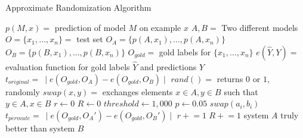 \begin{algorithm}
\caption{Approximate Randomization Algorithm}
\label{alg:approximate-randomization}
	\begin{algorithmic}[1]
    \STATE $p(M,x) =$ prediction of model $M$ on example $x$
    \STATE $A, B =$ Two different models
    \STATE $O = \{x_1, \dotsc, x_n\} =$ test set
    \STATE $O_A = \{p(A,x_1), \dotsc, p(A,x_n)\}$
    \STATE $O_B = \{p(B,x_1), \dotsc, p(B,x_n)\}$
    \STATE $O_{gold} =$ gold labels for $\{x_1, \dotsc, x_n\}$
    \STATE $e(\hat{Y},Y) =$ evaluation function for gold labels $\hat{Y}$ and predictions $Y$
    \STATE $t_{original} =\ \mid e(O_{gold},O_A) - e(O_{gold},O_B) \mid$
    \STATE $rand() =$ returns $0$ or $1$, randomly
    \STATE $swap(x,y) =$ exchanges elements $x \in A, y \in B$ such that $y \in A, x \in B$
    \STATE $r \leftarrow 0$
    \STATE $R \leftarrow 0$
    \STATE $threshold \leftarrow 1,000$
    \STATE $p \leftarrow 0.05$
          \STATE $swap(a_i,b_i)$
        \ENDIF
      \ENDFOR
      \STATE $t_{permute} =\ \mid e(O_{gold},O_A') - e(O_{gold},O_B') \mid$
        \STATE $r \mathrel{+}= 1$
      \ENDIF
      \STATE $R \mathrel{+}= 1$
    \ENDWHILE
      \STATE system $A$ truly better than system $B$
    \ENDIF
  \end{algorithmic}
\end{algorithm}





